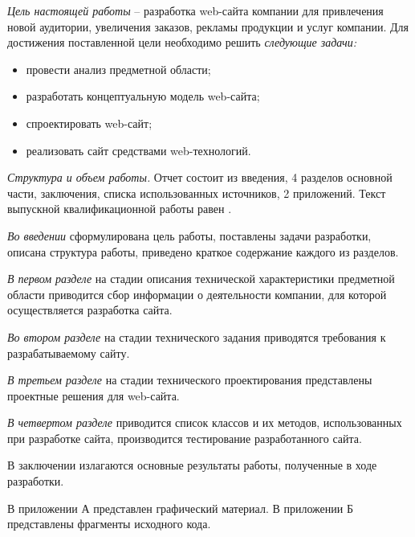 \emph{Цель настоящей работы} – разработка web-сайта компании для привлечения новой аудитории, увеличения заказов, рекламы продукции и услуг компании. Для достижения поставленной цели необходимо решить \emph{следующие задачи:}
\begin{itemize}
\item провести анализ предметной области;
\item разработать концептуальную модель web-сайта;
\item спроектировать web-сайт;
\item реализовать сайт средствами web-технологий.
\end{itemize}

\emph{Структура и объем работы.} Отчет состоит из введения, 4 разделов основной части, заключения, списка использованных источников, 2 приложений. Текст выпускной квалификационной работы равен .

\emph{Во введении} сформулирована цель работы, поставлены задачи разработки, описана структура работы, приведено краткое содержание каждого из разделов.

\emph{В первом разделе} на стадии описания технической характеристики предметной области приводится сбор информации о деятельности компании, для которой осуществляется разработка сайта.

\emph{Во втором разделе} на стадии технического задания приводятся требования к разрабатываемому сайту.

\emph{В третьем разделе} на стадии технического проектирования представлены проектные решения для web-сайта.

\emph{В четвертом разделе} приводится список классов и их методов, использованных при разработке сайта, производится тестирование разработанного сайта.

В заключении излагаются основные результаты работы, полученные в ходе разработки.

В приложении А представлен графический материал.
В приложении Б представлены фрагменты исходного кода. 